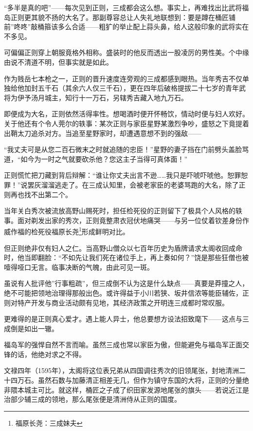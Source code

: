 \documentclass[
]{book}
\begin{document}
``多半是真的吧''------每次见到正则，三成都会这么想。事实上，再难找出比武将福岛正则更其貌不扬的大名了。那副尊容总让人失礼地联想到：要是蹲在桶匠铺前''咚咚''敲桶箍该多么合适------粗犷的举止配上蒜头鼻，给人这般印象的武将实在不多见。

可偏偏正则穿上朝服竟格外相称。盛装时的他反而透出一股凌厉的男性美。个中缘由说不清道不明，但事实就是如此。

作为贱岳七本枪之一，正则的晋升速度连旁观的三成都感到眼热。当年秀吉不仅单独给他加封五千石（其余六人仅三千石），更在四年后破格提拔二十七岁的青年武将为伊予汤月城主，知行十一万石，另辖秀吉藏入地九万石。

即便成为大名，正则依然活得率性。想喝酒时便开怀畅饮，情动时便与妇人欢好。关于他还有个令人莞尔的轶事：某次正则与家臣星野某激烈争吵，盛怒之下竟提着出鞘太刀追杀对方。当追至星野家时，却遭遇意想不到的强敌------

``我丈夫可是从您二百石微末之时就追随的忠臣！''星野的妻子挡在门前劈头盖脸骂道，``如今为一时之气就要砍杀他？您这主子当得可真体面！''

正则慌忙把刀藏到背后辩解：``谁让你丈夫出言不逊\ldots\ldots 我只是吓唬吓唬他。恕罪恕罪！''说罢灰溜溜逃走了。在三成认知里，会被老家臣的老婆骂跑的大名，除了正则再也找不出第二个。

当年关白秀次被流放高野山赐死时，担任检死役的正则留下了极具个人风格的轶事。面对剃发出家的秀次，正则竟整肃衣冠伏地痛哭------与另一位仗着钦差身份作威作福的检死役福原长尧\footnote{福原长尧：三成妹夫}形成鲜明对比。

但正则绝非仅有妇人之仁。当高野山僧众以七百年历史为盾牌请求太阁收回成命时，他当即翻脸：``不如先让我们死在诸位手上，再上奏如何？''饶是那些狂僧也被噎得哑口无言。临事决断的气魄，由此可见一斑。

虽说有人批评他''行事粗疏''，但三成倒不认为这是什么缺点------真要是莽撞之人，绝不可能把领地治理得那般出色。或许得益于小川若狭、坂井信浓等能臣辅佐，正则对特产开发与商业活动颇有见地，其经济政策之开明连三成都时常叹服。

更难得的是正则真心爱才。遇上能人异士，他总要想方设法招致麾下------这点与三成倒是如出一辙。

福岛军的强悍自然不言而喻。虽然三成也常以家臣为傲，但能避免与福岛军正面交锋的话，他绝对求之不得。

文禄四年（1595年），太阁将这位表兄弟从四国调往秀次的旧领尾张，封地清洲二十四万石。虽然石数与加藤清正相差无几，但作为镇守东国的大将，正则的分量绝非隈本城主可比。就这样，桶匠之子成了织田家发源地尾张的旗头------若说近江是治部少辅三成的领地，那么尾张便是清洲侍从正则的国度。
\end{document}
